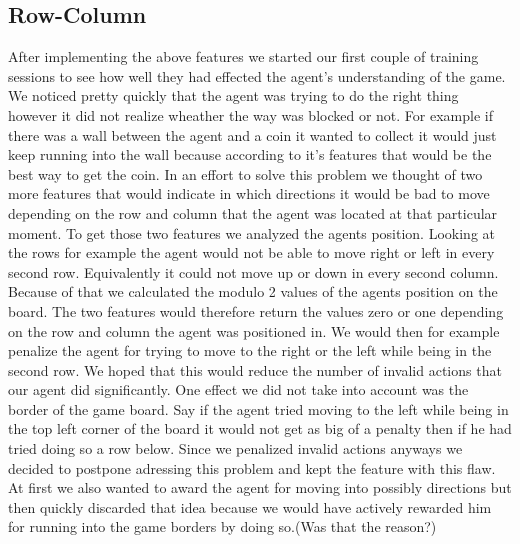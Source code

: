 \subsection{Row-Column}
After implementing the above features we started our first couple of training sessions to see how well they had effected the agent's understanding of the game. We noticed pretty quickly that the agent was trying to do the right thing however it did not realize wheather the way was blocked or not. For example if there was a wall between the agent and a coin it wanted to collect it would just keep running into the wall because according to it's features that would be the best way to get the coin. In an effort to solve this problem we thought of two more features that would indicate in which directions it would be bad to move depending on the row and column that the agent was located at that particular moment. To get those two features we analyzed the agents position. Looking at the rows for example the agent would not be able to move right or left in every second row. Equivalently it could not move up or down in every second column. Because of that we calculated the modulo 2 values of the agents position on the board. The two features would therefore return the values zero or one depending on the row and column the agent was positioned in. We would then for example penalize the agent for trying to move to the right or the left while being in the second row. We hoped that this would reduce the number of invalid actions that our agent did significantly. One effect we did not take into account was the border of the game board. Say if the agent tried moving to the left while being in the top left corner of the board it would not get as big of a penalty then if he had tried doing so a row below. Since we penalized invalid actions anyways we decided to postpone adressing this problem and kept the feature with this flaw. At first we also wanted to award the agent for moving into possibly directions but then quickly discarded that idea because we would have actively rewarded him for running into the game borders by doing so.(Was that the reason?) 








